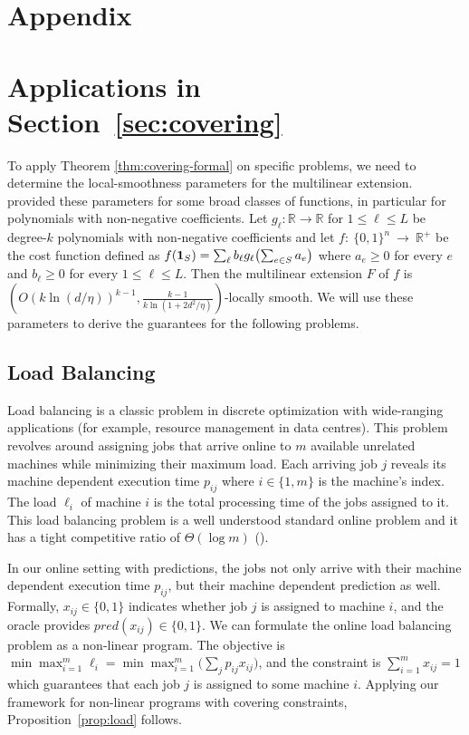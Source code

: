
\section*{Appendix}

\section{Applications in Section~\ref{sec:covering}}
To apply Theorem \ref{thm:covering-formal} on specific problems, we need to determine the local-smoothness parameters for the multilinear extension.
\cite{Thang20:Online-Primal-Dual} provided these parameters for some broad classes of functions, in particular for polynomials with non-negative coefficients. Let $g_{\ell}: \mathbb{R} \rightarrow \mathbb{R}$ for $1 \leq \ell \leq L$
be degree-$k$ polynomials with non-negative coefficients and let $f:~\{0,1\}^{n}~\rightarrow~\mathbb{R}^{+}$ be the cost function
defined as $f(\mathbf{1}_{S}) = \sum_{\ell} b_{\ell} g_{\ell}\bigl( \sum_{e \in S} a_{e} \bigr)$ where $a_{e} \geq 0$ for every
$e$ and $b_{\ell} \geq 0$ for every $1 \leq \ell \leq L$.
Then the multilinear extension $F$ of $f$ is $(O(k \ln(d/\eta))^{k-1}, \frac{k-1}{k \ln(1 + 2d^{2}/\eta)})$-locally smooth.
We will use these parameters to derive the guarantees for the following problems.




\subsection{Load Balancing}

Load balancing is a classic problem in discrete optimization with wide-ranging applications (for example, resource management in data centres).
This problem revolves around assigning jobs that arrive online to $m$ available unrelated machines while minimizing their maximum load.
Each arriving job $j$ reveals its machine dependent execution time $p_{ij}$ where $i \in \{1, m\}$ is the machine's index. The load $\ell_{i}$ of machine $i$ is the total processing time of the jobs assigned
to it. This load balancing problem is a well understood standard online problem and it has a tight competitive ratio of $\Theta(\log m)$ (\cite{BorodinEl-Yaniv05:Online-computation,Caragiannis08:Better-bounds}).

In our online setting with predictions, the jobs not only arrive with their machine dependent execution time $p_{ij}$, but their machine dependent prediction as well. Formally, $x_{ij} \in \{0,1\}$ indicates whether job $j$ is assigned to machine $i$, and the oracle provides $pred(x_{ij}) \in \{0,1\}$. We can formulate the online load balancing problem as a non-linear program. The objective is $\min \max_{i=1}^{m} \ell_{i} = \min \max_{i=1}^{m} \bigl(\sum_{j} p_{ij} x_{ij}\bigr)$, and the constraint is $\sum_{i=1}^{m} x_{ij} = 1$ which guarantees that each job $j$ is assigned to some machine $i$. Applying our framework for non-linear programs with covering constraints, Proposition~\ref{prop:load} follows.

